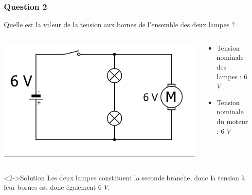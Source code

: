\documentclass[xcolor={dvipsnames}]{beamer}
\begin{document}
\begin{frame}
\frametitle{Question 2}
\begin{block}{}
	Quelle est la valeur de la tension aux bornes de l'ensemble des deux lampes ?
\end{block}


\begin{columns}
	\begin{column}{0.4\textwidth}
		\includegraphics[scale=0.2]{../2_schema}
		
	\end{column}
	
	\begin{column}{0.6\textwidth}
		\begin{itemize}
			\item Tension nominale des lampes : 6 $V$
			\item Tension nominale du moteur : 6 $V$
		\end{itemize}		
		
	\end{column}
\end{columns}

\begin{block}<2->{Solution}
	Les deux lampes constituent la seconde branche, donc la tension à leur bornes est donc également 6 $V$.
\end{block}


\end{frame}
\end{document}
